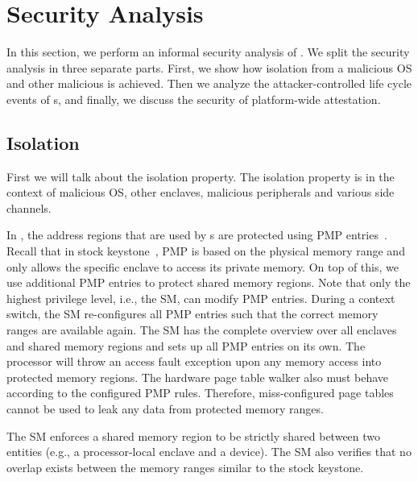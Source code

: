 \section{Security Analysis}
\label{sec:securityAnalysis}

In this section, we perform an informal security analysis of \name. We split the security analysis in three separate parts. First, we show how isolation from a malicious OS and other malicious \sphw is achieved. Then we analyze the attacker-controlled life cycle events of \nameenclave{}s, and finally, we discuss the security of platform-wide attestation. 

\subsection{Isolation}

First we will talk about the isolation property. The isolation property is in the context of malicious OS, other enclaves, malicious peripherals and various side channels. 

 In \name{}, the address regions that are used by \nameenclave{}s are protected using PMP entries~\cite{riscv2019privspec}. 
Recall that in stock keystone~\cite{keystone}, PMP is based on the physical memory range and only allows the specific enclave to access its private memory. On top of this, we use additional PMP entries to protect shared memory regions. 
Note that only the highest privilege level, i.e., the SM, can modify PMP entries. During a context switch, the SM re-configures all PMP entries such that the correct memory ranges are available again. The SM has the complete overview over all enclaves and shared memory regions and sets up all PMP entries on its own. The processor will throw an access fault exception upon any memory access into protected memory regions. The hardware page table walker also must behave according to the configured PMP rules. Therefore, miss-configured page tables cannot be used to leak any data from protected memory ranges.

The SM enforces a shared memory region to be strictly shared between two entities (e.g., a processor-local enclave and a \sphw device). The SM also verifies that no overlap exists between the memory ranges similar to the stock keystone. 

